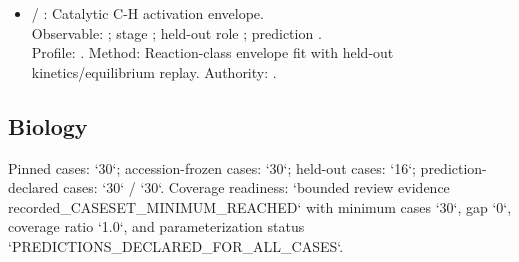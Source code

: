 \begin{itemize}
\item {} / : Catalytic C-H activation envelope.\\ Observable: ; stage ; held-out role ; prediction .\\ Profile: . Method: Reaction-class envelope fit with held-out kinetics/equilibrium replay. Authority: .
\end{itemize}

\subsection{Biology}
Pinned cases: `30`; accession-frozen cases: `30`; held-out cases: `16`; prediction-declared cases: `30` / `30`.
Coverage readiness: `bounded review evidence recorded\_CASESET\_MINIMUM\_REACHED` with minimum cases `30`, gap `0`, coverage ratio `1.0`, and parameterization status `PREDICTIONS\_DECLARED\_FOR\_ALL\_CASES`.
